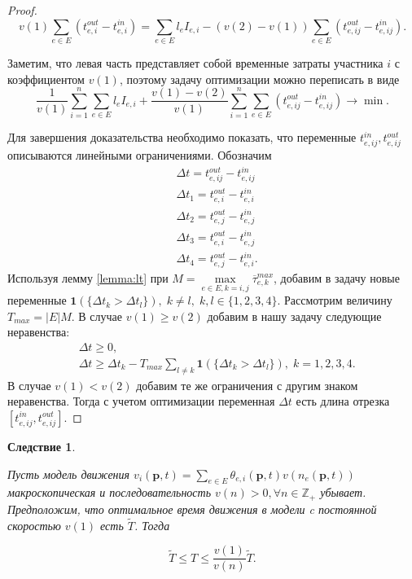 \documentclass[12pt, a4paper]{article}
\DeclareMathOperator*{\minn}{min}
\newtheorem{corollary}{Следствие}[section]
\begin{document}
\begin{proof}
	$$v(1) \sum \limits _{e \in E} (t_{e, i}^{out} - t_{e, i}^{in}) = \sum \limits _{e \in E} l_e I_{e, i} - (v(2) - v(1)) \sum \limits _{e \in E} (t_{e, ij}^{out} - t_{e, ij}^{in}).$$
	
	Заметим, что левая часть представляет собой временные затраты участника $i$ с коэффициентом $v(1)$, поэтому задачу оптимизации можно переписать в виде
	$$ \frac{1}{v (1)} \sum\limits_{i = 1}^n \sum \limits _{e \in E} l_e I_{e, i} + \frac{v(1) - v(2)}{v (1)}  \sum\limits_{i = 1}^n \sum \limits _{e \in E} (t_{e, ij}^{out} - t_{e, ij}^{in}) \rightarrow \minn .$$
	
	Для завершения доказательства необходимо показать, что переменные $t_{e, ij}^{in}, t_{e, ij}^{out}$ описываются линейными ограничениями. Обозначим
	\begin{align*}
		& \Delta t = t_{e, ij}^{out} - t_{e, ij}^{in} \\
		& \Delta t_1 =  t_{e, i}^{out} - t_{e, i}^{in}  \\
		& \Delta t_2 =  t_{e, j}^{out} - t_{e, j}^{in} \\
		& \Delta t_3 =  t_{e, i}^{out} - t_{e, j}^{in} \\
		& \Delta t_4 =  t_{e, j}^{out} - t_{e, i}^{in}.
	\end{align*}
	Используя лемму \ref{lemma:lt} при $M = \max\limits_{e \in E, k = i, j} \overline{\tau}_{e, k}^{max}$, добавим в задачу новые переменные $\textbf{1} (\{ \Delta t_k > \Delta t_l\}), \; k \ne l, \; k, l \in \{1, 2, 3, 4\}$. Рассмотрим величину $T_{max} = |E|M$. В случае $v(1) \ge v(2)$ добавим в нашу задачу следующие неравенства: 
	\begin{align*}
	& \Delta t \ge 0, \\
	& \Delta t \ge \Delta t_k - T_{max} \sum \limits_{l \ne k} {\textbf{1} (\{ \Delta t_k > \Delta t_l\})}, \; k = 1, 2, 3, 4.
	\end{align*}
	В случае $v(1) < v(2)$ добавим те же ограничения с другим знаком неравенства. Тогда с учетом оптимизации переменная $\Delta t$ есть длина отрезка $[t_{e, ij}^{in}, t_{e, ij}^{out}]$. 
	
\end{proof}

\begin{corollary}
	\label{corollary:rel}

	Пусть модель движения $ v_i(\textbf{p}, t) = \sum \limits _{e \in E} \theta_{e, i} (\textbf{p}, t) v (n_e (\textbf{p}, t))$ макроскопическая и последовательность $v(n) > 0, \forall n \in \mathbb{Z}_+$ убывает. Предположим, что оптимальное время движения в модели c постоянной скоростью $v(1)$ есть $\widetilde{T}$. Тогда

	$$ \widetilde{T} \le T \le \frac {v(1)}{v(n)} \widetilde{T}.$$
	
\end{corollary}
\end{document}
